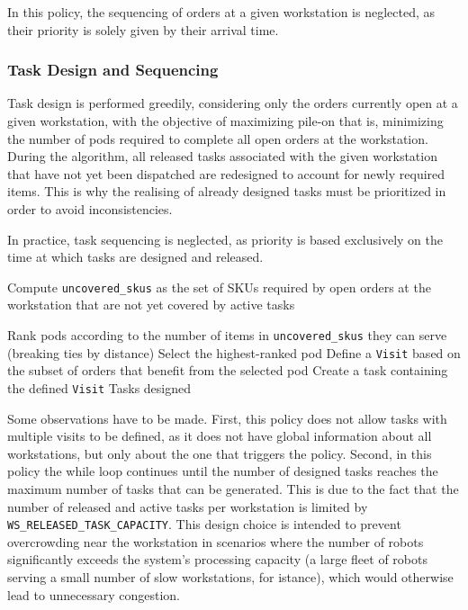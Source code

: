 \documentclass[a4paper,10pt]{article}
\begin{document}
In this policy, the sequencing of orders at a given workstation is neglected, as their priority is solely given by their arrival time.

\subsubsection{Task Design and Sequencing}
Task design is performed greedily, considering only the orders currently open at a given workstation, with the objective of maximizing pile-on that is, minimizing the number of pods required to complete all open orders at the workstation.  
During the algorithm, all released tasks associated with the given workstation that have not yet been dispatched are redesigned to account for newly required items. This is why the realising of already designed tasks must be prioritized in order to avoid inconsistencies.

In practice, task sequencing is neglected, as priority is based exclusively on the time at which tasks are designed and released.

\begin{algorithm}
\caption{Task Design}
\begin{algorithmic}[1]
\State Compute \texttt{uncovered\_skus} as the set of SKUs required by open orders at the workstation that are not yet covered by active tasks
    \State \Return
\EndIf

    \State Rank pods according to the number of items in \texttt{uncovered\_skus} they can serve (breaking ties by distance)
    \State Select the highest-ranked pod
    \State Define a \texttt{Visit} based on the subset of orders that benefit from the selected pod
    \State Create a task containing the defined \texttt{Visit}
\EndWhile
\State \Return Tasks designed
\end{algorithmic}
\end{algorithm}

Some observations have to be made. 
First, this policy does not allow tasks with multiple visits to be defined, as it does not have global information about all workstations, but only about the one that triggers the policy.
Second, in this policy the while loop continues until the number of designed tasks reaches the maximum number of tasks that can be generated. This is due to the fact that the number of released and active tasks per workstation is limited by \texttt{WS\_RELEASED\_TASK\_CAPACITY}. This design choice is intended to prevent overcrowding near the workstation in scenarios where the number of robots significantly exceeds the system's processing capacity (a large fleet of robots serving a small number of slow workstations, for istance), which would otherwise lead to unnecessary congestion.
\end{document}
